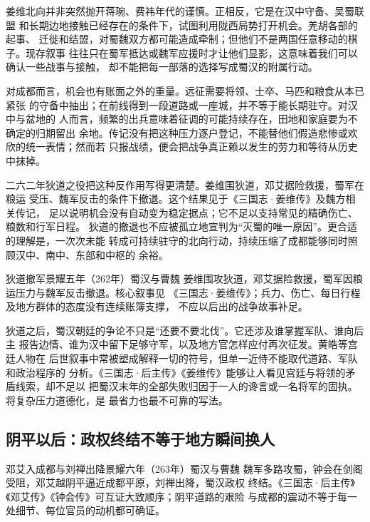 姜维北向并非突然抛开蒋琬、费祎年代的谨慎。正相反，它是在汉中守备、吴蜀联盟
和长期边地接触已经存在的条件下，试图利用陇西局势打开机会。羌胡各部的起事、
迁徙和结盟，对蜀魏双方都可能造成牵制；但他们不是两国任意移动的棋子。现存叙事
往往只在蜀军抵达或魏军应援时才让他们显影，这意味着我们可以确认一些战事与接触，
却不能把每一部落的选择写成蜀汉的附属行动。

对成都而言，机会也有账面之外的重量。远征需要将领、士卒、马匹和粮食从本已紧张
的守备中抽出；在前线得到一段道路或一座城，并不等于能长期驻守。对汉中与盆地的
人而言，频繁的出兵意味着征调的可能持续存在，田地和家庭要为不确定的归期留出
余地。传记没有把这种压力逐户登记，不能替他们假造悲惨或欢欣的统一表情；然而若
只报战绩，便会把战争真正赖以发生的劳力和等待从历史中抹掉。

二六二年狄道之役把这种反作用写得更清楚。姜维围狄道，邓艾据险救援，蜀军在粮运
受压、魏军反击的条件下撤退。这个结果见于《三国志·姜维传》及魏方相关传记，
足以说明机会没有自动变为稳定据点；它不足以支持常见的精确伤亡、粮数和行军日程。
狄道的撤退也不应被孤立地宣判为“灭蜀的唯一原因”。更合适的理解是，一次次未能
转成可持续驻守的北向行动，持续压缩了成都能够同时照顾汉中、南中、东部和中枢的
余裕。

\begin{event}{狄道撤军}{景耀五年（262年）}{蜀汉与曹魏}{}
姜维围攻狄道，邓艾据险救援，蜀军因粮运压力与魏军反击撤退。核心叙事见
《三国志·姜维传》；兵力、伤亡、每日行程及地方群体的态度没有连续账簿支撑，
不应以后出的战争故事补足。
\end{event}

狄道之后，蜀汉朝廷的争论不只是“还要不要北伐”。它还涉及谁掌握军队、谁向后主
报告边情、谁为汉中留下足够守军，以及地方官怎样应付再次征发。黄皓等宫廷人物在
后世叙事中常被塑成解释一切的符号，但单一近侍不能取代道路、军队和政治程序的
分析。《三国志·后主传》《姜维传》能够让人看见宫廷与将领的矛盾线索，却不足以
把蜀汉末年的全部失败归因于一人的谗言或一名将军的固执。将复杂压力道德化，是
最省力也最不可靠的写法。

\subsection{阴平以后：政权终结不等于地方瞬间换人}

\begin{event}{邓艾入成都与刘禅出降}{景耀六年（263年）}{蜀汉与曹魏}{}
魏军多路攻蜀，钟会在剑阁受阻，邓艾越阴平逼近成都平原，刘禅出降，蜀汉政权
终结。《三国志·后主传》《邓艾传》《钟会传》可互证大致顺序；阴平道路的艰险
与成都的震动不等于每一处细节、每位官员的动机都可确证。
\end{event}

